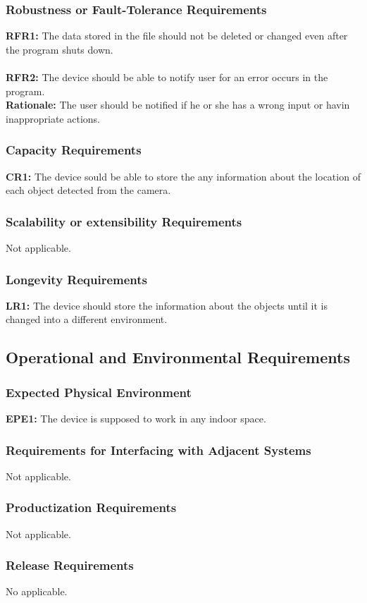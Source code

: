 \documentclass[12pt]{article}
\begin{document}
\subsubsection{Robustness or Fault-Tolerance Requirements}
\textbf{RFR1:} The data stored in the file should not be deleted or changed even after the program shuts down.\\\\
\textbf{RFR2:} The device should be able to notify user for an error occurs in the program.\\
\textbf{Rationale:} The user should be notified if he or she has a wrong input or havin inappropriate actions.
\subsubsection{Capacity Requirements}
\textbf{CR1:} The device sould be able to store the any information about the location of each object detected from the camera.
\subsubsection{Scalability or extensibility Requirements}
Not applicable.
\subsubsection{Longevity Requirements}
\textbf{LR1:} The device should store the information about the objects until it is changed into a different environment.
\subsection{Operational and Environmental Requirements}
\subsubsection{Expected Physical Environment}
\textbf{EPE1:} The device is supposed to work in any indoor space.
\subsubsection{Requirements for Interfacing with Adjacent Systems}
Not applicable.
\subsubsection{Productization Requirements}
Not applicable.
\subsubsection{Release Requirements}
No applicable.
\end{document}
